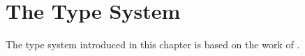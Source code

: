 \chapter{The Type System}\label{chapter:the-type-system}

The type system introduced in this chapter is based on the work of \cite{Paykin2016TheEO}.


